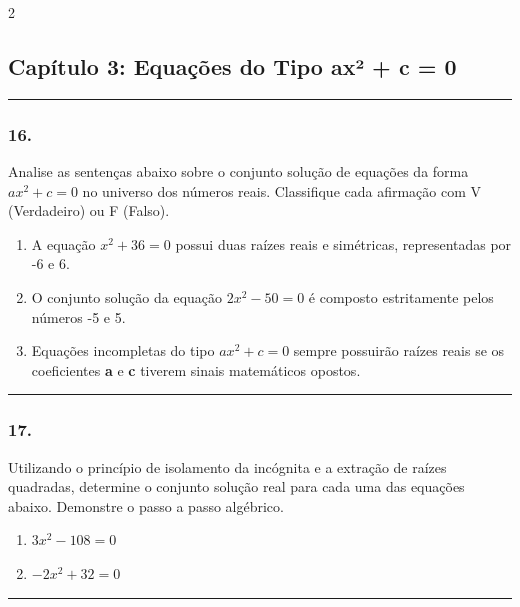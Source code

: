 \documentclass[twoside, 10pt, a4paper]{article}
\newlength{\espacoPosTitulo}\setlength{\espacoPosTitulo}{0.3cm}
\newlength{\espacoPreQuestao}\setlength{\espacoPreQuestao}{0.1cm}
\newlength{\espacoQuestao}\setlength{\espacoQuestao}{0.2cm}
\begin{document}
\begin{multicols*}{2}
\subsection*{Capítulo 3: Equações do Tipo ax² + c = 0}
\vspace{-0.2cm}\noindent\rule{\linewidth}{1.5pt} 
\par\vspace{\espacoPosTitulo}
\subsubsection*{16.} Analise as sentenças abaixo sobre o conjunto solução de equações da forma $ ax^2 + c = 0 $ no universo dos números reais. Classifique cada afirmação com V (Verdadeiro) ou F (Falso).
\begin{enumerate}[label=\Roman*.]
    \item A equação $ x^2 + 36 = 0 $ possui duas raízes reais e simétricas, representadas por -6 e 6.
    \item O conjunto solução da equação $ 2x^2 - 50 = 0 $ é composto estritamente pelos números -5 e 5.
    \item Equações incompletas do tipo $ ax^2 + c = 0 $ sempre possuirão raízes reais se os coeficientes \textbf{a} e \textbf{c} tiverem sinais matemáticos opostos.
\end{enumerate}
\par\vspace{\espacoQuestao}

\noindent\textcolor{CorLinha}{\rule{\linewidth}{0.5pt}} 
\par\vspace{\espacoPreQuestao}
\subsubsection*{17.} Utilizando o princípio de isolamento da incógnita e a extração de raízes quadradas, determine o conjunto solução real para cada uma das equações abaixo. Demonstre o passo a passo algébrico.
\begin{enumerate}[label=\Alph*)]
    \item $ 3x^2 - 108 = 0 $
    \item $ -2x^2 + 32 = 0 $
\end{enumerate}
\par\vspace{\espacoQuestao}

\noindent\textcolor{CorLinha}{\rule{\linewidth}{0.5pt}} 
\par\vspace{\espacoPreQuestao}

\end{multicols*}
\end{document}
